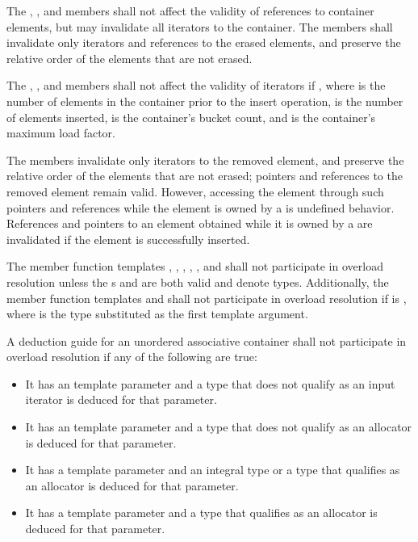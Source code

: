 \pnum
{}%
The , , and  members
shall not affect the validity of references to
container elements, but may invalidate all iterators to the
container.  The  members shall invalidate only iterators and
references to the erased elements, and preserve the relative order of the
elements that are not erased.

\pnum
{}%
%
The , , and  members
shall not affect the validity of iterators if
, where  is the number of elements in
the container prior to the insert operation,  is the
number of elements inserted,  is the container's bucket count, and
 is the container's maximum load factor.

\pnum
The  members invalidate only iterators to the removed element,
and preserve the relative order of the elements that are not erased; pointers
and references to the removed element remain valid. However, accessing the
element through such pointers and references while the element is owned by a
 is undefined behavior. References and pointers to an element
obtained while it is owned by a  are invalidated if the
element is successfully inserted.

\pnum
The member function templates
, , , ,
, and 
shall not participate in overload resolution unless
the s
 and
are both valid and denote types.
Additionally, the member function templates  and 
shall not participate in overload resolution if
is ,
where  is the type substituted as the first template argument.

\pnum
A deduction guide for an unordered associative container shall not participate in overload resolution
if any of the following are true:
\begin{itemize}
\item It has an  template parameter
and a type that does not qualify as an input iterator is deduced for that parameter.

\item It has an  template parameter
and a type that does not qualify as an allocator is deduced for that parameter.

\item It has a  template parameter
and an integral type or a type that qualifies as an allocator is deduced for that parameter.

\item It has a  template parameter
and a type that qualifies as an allocator is deduced for that parameter.
\end{itemize}

